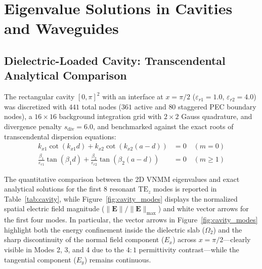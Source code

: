 \documentclass[11pt,a4paper]{article}
\begin{document}
\section{Eigenvalue Solutions in Cavities and Waveguides}

\subsection{Dielectric-Loaded Cavity: Transcendental Analytical Comparison}
The rectangular cavity $[0, \pi]^2$ with an interface at $x = \pi/2$ ($\varepsilon_{r1} = 1.0$, $\varepsilon_{r2} = 4.0$) was discretized with $441$ total nodes ($361$ active and $80$ staggered PEC boundary nodes), a $16 \times 16$ background integration grid with $2 \times 2$ Gauss quadrature, and divergence penalty $s_{\mathrm{div}} = 6.0$, and benchmarked against the exact roots of transcendental dispersion equations:
\begin{align}
k_{x1} \cot(k_{x1} d) + k_{x2} \cot(k_{x2} (a - d)) &= 0 \quad (m = 0) \\
\frac{\beta_1}{\varepsilon_{r1}} \tan(\beta_1 d) + \frac{\beta_2}{\varepsilon_{r2}} \tan(\beta_2 (a - d)) &= 0 \quad (m \ge 1)
\end{align}

The quantitative comparison between the 2D VNMM eigenvalues and exact analytical solutions for the first 8 resonant $\mathrm{TE}_z$ modes is reported in Table~\ref{tab:cavity}, while Figure~\ref{fig:cavity_modes} displays the normalized spatial electric field magnitude ($\|\mathbf{E}\|/\|\mathbf{E}\|_{\max}$) and white vector arrows for the first four modes. In particular, the vector arrows in Figure~\ref{fig:cavity_modes} highlight both the energy confinement inside the dielectric slab ($\Omega_2$) and the sharp discontinuity of the normal field component ($E_x$) across $x = \pi/2$---clearly visible in Modes 2, 3, and 4 due to the $4:1$ permittivity contrast---while the tangential component ($E_y$) remains continuous.
\end{document}
